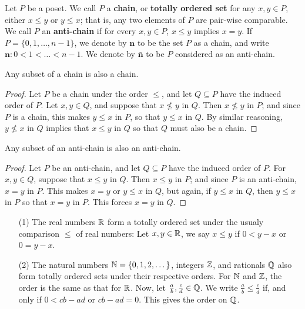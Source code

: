 \begin{definition}
  Let $P$ be a poset. We call $P$ a \textbf{chain}, or \textbf{totally
  ordered set} for any $x,y \in P$, either $x \leq y$ or $y \leq x$;
  that is, any two elements of $P$ are pair-wise comparable. We call
  $P$ an  \textbf{anti-chain} if for every $x,y \in P$, $x \leq y$
  implies $x=y$. If $P=\{0, 1, \dots, n-1\}$, we denote by
  $\textbf{n}$ to be the set $P$ as a chain, and write
  $\textbf{n}:0<1< \dots < n-1$. We denote by $\bar{\textbf{n}}$ to be
  $P$ considered as an anti-chain.
\end{definition}

\begin{proposition}\label{proposition_1.1.1}
  Any subset of a chain is also a chain.
\end{proposition}
\begin{proof}
  Let $P$ be a chain under the order $\leq$, and let $Q \subseteq P$
  have the induced order of $P$. Let  $x,y \in Q$, and suppose that $x
  \nleq y$ in $Q$. Then  $x \nleq y$ in $P$; and since $P$ is a chain,
  this makes  $y \leq x$ in $P$, so that  $y \leq x$ in $Q$.
  By similar reasoning,  $y \nleq x$ in $Q$ implies that $x \leq y$ in
  $Q$ so that $Q$ must also be a chain.
\end{proof}

\begin{proposition}\label{proposition_1.1.2}
  Any subset of an anti-chain is also an anti-chain.
\end{proposition}
\begin{proof}
  Let $P$ be an anti-chain, and let $Q \subseteq P$ have the induced
  order of $P$. For  $x,y \in Q$, suppose that $x \leq y$ in $Q$. Then
   $x \leq y$ in $P$; and since $P$ is an anti-chain, $x=y$ in $P$.
   This makes $x=y$ or  $y \leq x$ in $Q$, but again, if  $y \leq x$
   in $Q$, then  $y \leq x$ in $P$ so that $x=y$ in $P$. This forces
   $x=y$ in $Q$.
\end{proof}

\begin{example}\label{example_1.2}
  \begin{enumerate}
    \item[(1)] The real numbers $\mathbb{R}$ form a totally ordered set under
      the usualy comparison $\leq$ of real numbers: Let $x,y \in \mathbb{R}$,
      we say $x \leq y$ if $0<y-x$ or $0=y-x$.

    \item[(2)] The natural numbers $\mathbb{N}=\{0, 1, 2, \dots\}$, integers
      $\mathbb{Z}$, and rationals $\mathbb{Q}$ also form totally ordered sets under
      their respective orders. For $\mathbb{N}$ and $\mathbb{Z}$, the order is the
      same as that for $\mathbb{R}$. Now, let $\frac{a}{b}, \frac{c}{d} \in
      \mathbb{Q}$. We write $\frac{a}{b} \leq \frac{c}{d}$ if, and only if
      $0<cb-ad$ or  $cb-ad=0$. This gives the order on $\mathbb{Q}$.
  \end{enumerate}
\end{example}

